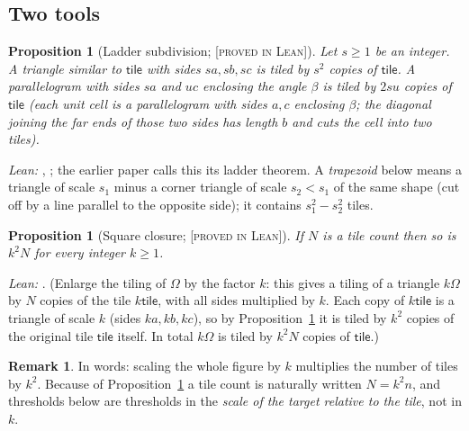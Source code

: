 \documentclass[11pt,reqno]{amsart}
\theoremstyle{plain}
\newtheorem{proposition}[theorem]{Proposition}
\theoremstyle{definition}
\newtheorem{remark}[theorem]{Remark}
\newcommand{\lab}[1]{\textup{[\textsc{#1}]}}
\newcommand{\PL}{\lab{proved in Lean}}
\newcommand{\tile}{\mathsf{tile}}
\begin{document}
\subsection{Two tools}\label{sub:tools}
\begin{proposition}[Ladder subdivision; \PL{}]\label{prop:ladder}
Let $s\ge1$ be an integer. A triangle similar to $\tile$ with sides $sa,sb,sc$ is tiled by $s^2$ copies of $\tile$.
A parallelogram with sides $sa$ and $uc$ enclosing the angle $\beta$ is tiled by $2su$ copies of $\tile$ (each unit cell is a parallelogram with sides $a,c$ enclosing $\beta$; the diagonal joining the far ends of those two sides has length $b$ and cuts the cell into two tiles).
\end{proposition}
\emph{Lean:} , ; the earlier paper calls this its ladder theorem.
A \emph{trapezoid} below means a triangle of scale $s_1$ minus a corner triangle of scale $s_2<s_1$ of the same shape (cut off by a line parallel to the opposite side); it contains $s_1^2-s_2^2$ tiles.
\begin{proposition}[Square closure; \PL{}]\label{prop:square}
If $N$ is a tile count then so is $k^2N$ for every integer $k\ge1$.
\end{proposition}
\emph{Lean:} . (Enlarge the tiling of $\Omega$ by the factor $k$: this gives a tiling of a triangle $k\Omega$ by $N$ copies of the tile $k\tile$, with all sides multiplied by $k$. Each copy of $k\tile$ is a triangle of scale $k$ (sides $ka,kb,kc$), so by Proposition~\ref{prop:ladder} it is tiled by $k^2$ copies of the original tile $\tile$ itself. In total $k\Omega$ is tiled by $k^2N$ copies of $\tile$.)
\begin{remark}
In words: scaling the whole figure by $k$ multiplies the number of tiles by $k^2$.
Because of Proposition~\ref{prop:square} a tile count is naturally written $N=k^2n$, and thresholds below are thresholds in the \emph{scale of the target relative to the tile}, not in $k$.
\end{remark}


\end{document}
